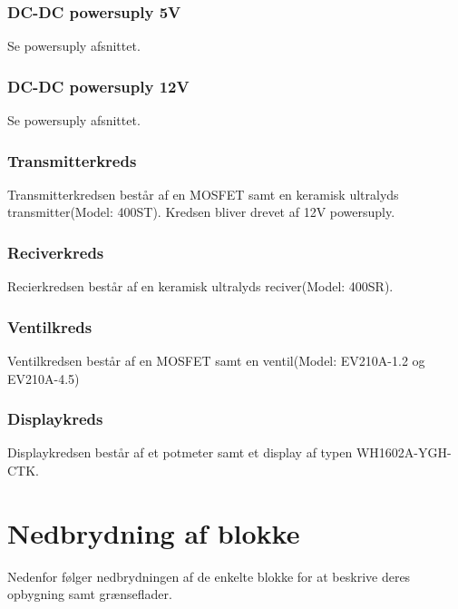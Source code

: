 \subsubsection{DC-DC powersuply 5V}
Se powersuply afsnittet.
\subsubsection{DC-DC powersuply 12V}
Se powersuply afsnittet.
\subsubsection{Transmitterkreds}
Transmitterkredsen består af en MOSFET samt en keramisk ultralyds transmitter(Model: 400ST). Kredsen bliver drevet af 12V powersuply. 
\subsubsection{Reciverkreds}
Recierkredsen består af en keramisk ultralyds reciver(Model: 400SR).
\subsubsection{Ventilkreds}
Ventilkredsen består af en MOSFET samt en ventil(Model: EV210A-1.2 og EV210A-4.5)
\subsubsection{Displaykreds}
Displaykredsen består af et potmeter samt et display af typen WH1602A-YGH-CTK.
\section{Nedbrydning af blokke}
Nedenfor følger nedbrydningen af de enkelte blokke for at beskrive deres opbygning samt grænseflader.
